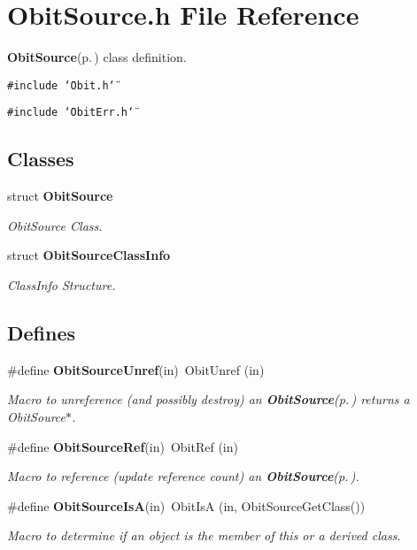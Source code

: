 \section{Obit\-Source.h File Reference}
\label{ObitSource_8h}
{\bf Obit\-Source}{\rm (p.\,\pageref{structObitSource})} class definition. 

{\tt \#include \char`\"{}Obit.h\char`\"{}}\par
{\tt \#include \char`\"{}Obit\-Err.h\char`\"{}}\par
\subsection*{Classes}
\begin{CompactItemize}
\item 
struct {\bf Obit\-Source}
\begin{CompactList}\small\item\em Obit\-Source Class. \item\end{CompactList}\item 
struct {\bf Obit\-Source\-Class\-Info}
\begin{CompactList}\small\item\em Class\-Info Structure. \item\end{CompactList}\end{CompactItemize}
\subsection*{Defines}
\begin{CompactItemize}
\item 
\#define {\bf Obit\-Source\-Unref}(in)\ Obit\-Unref (in)
\begin{CompactList}\small\item\em Macro to unreference (and possibly destroy) an {\bf Obit\-Source}{\rm (p.\,\pageref{structObitSource})} returns a Obit\-Source$\ast$. \item\end{CompactList}\item 
\#define {\bf Obit\-Source\-Ref}(in)\ Obit\-Ref (in)
\begin{CompactList}\small\item\em Macro to reference (update reference count) an {\bf Obit\-Source}{\rm (p.\,\pageref{structObitSource})}. \item\end{CompactList}\item 
\#define {\bf Obit\-Source\-Is\-A}(in)\ Obit\-Is\-A (in, Obit\-Source\-Get\-Class())
\begin{CompactList}\small\item\em Macro to determine if an object is the member of this or a derived class. \item\end{CompactList}\end{CompactItemize}
